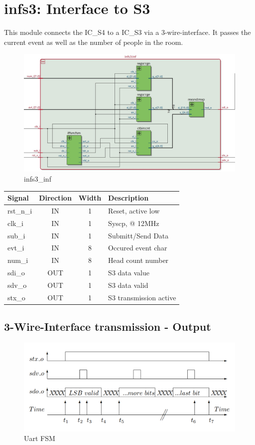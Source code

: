 \documentclass[12pt,a4 paper] {report}
\begin{document}
\section{infs3: Interface to S3}
This module connects the IC\_S4 to a IC\_S3 via a 3-wire-interface. It passes the current event as well as the number 
of people in the room.
\begin{figure}[h]
	\centering	
	\includegraphics[scale=0.25]{../png/infs3_inf.png}
	\caption{infs3\_inf}
\end{figure}
\begin{center}
	\begin{tabular}{ | p{2cm} | c | c | p{5cm} |}
		\hline
		\textbf{Signal} & \textbf{Direction} & \textbf{Width} & \textbf{Description} \\
		\hline	
  	rst\_n\_i & IN & 1 & Reset, active low \\
  	\hline
		clk\_i & IN & 1 & Syscp, @ 12MHz \\
		\hline
		sub\_i & IN & 1 & Submitt/Send Data \\
		\hline
		evt\_i & IN & 8 &  Occured event char \\
		\hline
		num\_i & IN & 8 & Head count number \\
		\hline
		sdi\_o & OUT & 1 & S3 data value \\
		\hline
		sdv\_o & OUT & 1 & S3 data valid \\
		\hline
		stx\_o & OUT & 1 & S3 transmission active\\
		\hline
	\end{tabular}
\end{center}
\subsection*{3-Wire-Interface transmission - Output}
\begin{figure}[h]
	\centering	
	\includegraphics[scale=0.4]{../png/3wireinterface.png}
	\caption{Uart FSM}
\end{figure}
\end{document}
